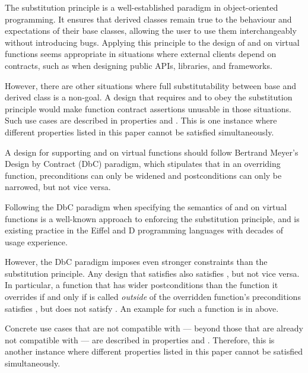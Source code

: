 The substitution principle is a well-established paradigm in object-oriented programming. It ensures that derived classes remain true to the behaviour and expectations of their base classes, allowing the user to use them interchangeably without introducing bugs. Applying this principle to the design of  and  on virtual functions seems appropriate in situations where external clients depend on contracts, such as when designing public APIs, libraries, and frameworks.

However, there are other situations where full substitutability between base and derived class is a non-goal. A design that requires  and  to obey the substitution principle would make function contract assertions unusable in those situations. Such use cases are described in properties  and . This is one instance where different properties listed in this paper  cannot be satisfied simultaneously.


A design for supporting  and  on virtual functions should follow Bertrand Meyer's Design by Contract (DbC) paradigm, which stipulates that in an overriding function, preconditions can only be widened and postconditions can only be narrowed, but not vice versa.

Following the DbC paradigm when  specifying the semantics of  and  on virtual functions is a well-known approach to enforcing the substitution principle, and is existing practice in the Eiffel and D programming languages with decades of usage experience.

However, the DbC paradigm imposes even stronger constraints than the substitution principle. Any design that satisfies  also satisfies , but not vice versa. In particular, a function that has wider postconditions than the function it overrides if and only if is called \emph{outside} of the overridden function's preconditions satisfies , but does not satisfy . An example for such a function is  in  above.

Concrete use cases that are not compatible with  --- beyond those that are already not compatible with  --- are described in properties  and . Therefore, this is another instance where different properties listed in this paper cannot be satisfied simultaneously.

